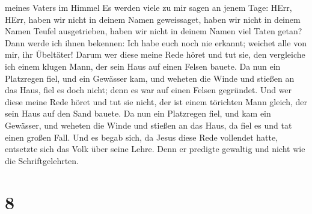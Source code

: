 meines Vaters im Himmel  Es werden viele zu mir sagen an
jenem Tage: HErr, HErr, haben wir nicht in deinem Namen geweissaget,
haben wir nicht in deinem Namen Teufel ausgetrieben, haben wir nicht in
deinem Namen viel Taten getan?  Dann werde ich ihnen
bekennen: Ich habe euch noch nie erkannt; weichet alle von mir, ihr
Übeltäter!  Darum wer diese meine Rede höret und tut sie,
den vergleiche ich einem klugen Mann, der sein Haus auf einen Felsen
bauete.  Da nun ein Platzregen fiel, und ein Gewässer kam,
und weheten die Winde und stießen an das Haus, fiel es doch nicht; denn
es war auf einen Felsen gegründet.  Und wer diese meine
Rede höret und tut sie nicht, der ist einem törichten Mann gleich, der
sein Haus auf den Sand bauete.  Da nun ein Platzregen fiel,
und kam ein Gewässer, und weheten die Winde und stießen an das Haus, da
fiel es und tat einen großen Fall.  Und es begab sich, da
Jesus diese Rede vollendet hatte, entsetzte sich das Volk über seine
Lehre.  Denn er predigte gewaltig und nicht wie die
Schriftgelehrten.

\hypertarget{section-7}{%
\section{8}\label{section-7}}

